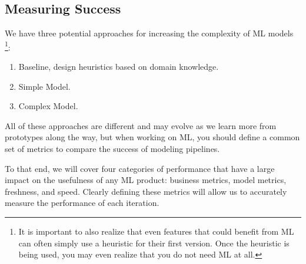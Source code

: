 \subsection{Measuring Success}
We have three potential approaches for increasing the complexity of ML models
\footnote{
    It is important to also realize that even features that could benefit from
    ML can often simply use a heuristic for their first version. Once the
    heuristic is being used, you may even realize that you do not need ML at all.
}:
\begin{enumerate}
    \item[1.] Baseline, design heuristics based on domain knowledge.
    \item[2.] Simple Model. 
    \item[3.] Complex Model.
\end{enumerate} 
All of these approaches are different and may evolve as we learn more from
prototypes along the way, but when working on ML, you should define a common
set of metrics to compare the success of modeling pipelines.

To that end, we will cover four categories of performance that have a
large impact on the usefulness of any ML product: business metrics,
model metrics, freshness, and speed. Clearly defining these metrics will
allow us to accurately measure the performance of each iteration.

